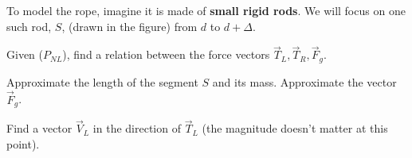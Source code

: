 \documentclass{workbook}
\begin{document}
\begin{slide}
\begin{itemize}

\end{itemize}

To model the rope, imagine it is made of \textbf{small rigid rods}.
We will focus on one such rod, $S$, (drawn in the figure) from $d$ to $d+\Delta$.

\begin{parts}

\item Given ($P_{NL}$), find a relation between the force vectors $\vec{T}_L, \vec{T}_R, \vec{F}_g$.
\item Approximate the length of the segment $S$ and its mass. Approximate the vector $\vec{F}_g$.
\item Find a vector $\vec{V}_L$ in the direction of $\vec{T}_L$ (the magnitude doesn't matter at this point).
\end{parts}
	
\end{slide}
\end{document}
